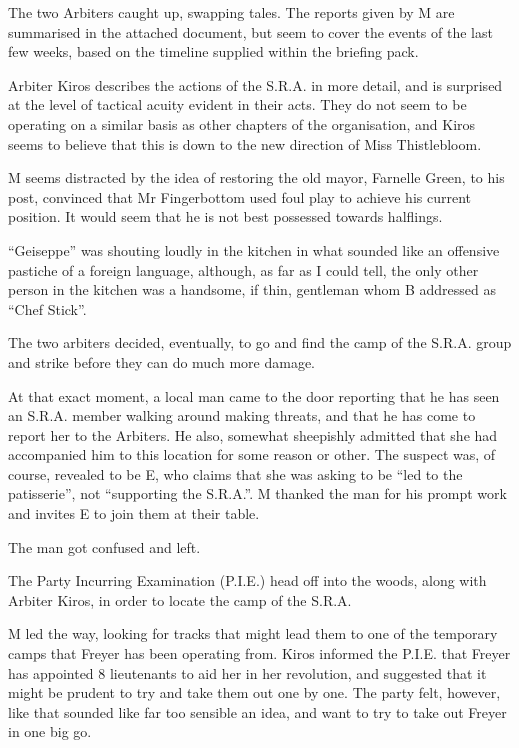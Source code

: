 The two Arbiters caught up, swapping tales. The reports given by M are summarised in the attached document, but seem to cover the events of the last few weeks, based on the timeline supplied within the briefing pack.\medskip

Arbiter Kiros describes the actions of the S.R.A. in more detail, and is surprised at the level of tactical acuity evident in their acts. They do not seem to be operating on a similar basis as other chapters of the organisation, and Kiros seems to believe that this is down to the new direction of Miss Thistlebloom.\medskip

M seems distracted by the idea of restoring the old mayor, Farnelle Green, to his post, convinced that Mr Fingerbottom used foul play to achieve his current position. It would seem that he is not best possessed towards halflings.\medskip

“Geiseppe” was shouting loudly in the kitchen in what sounded like an offensive pastiche of a foreign language, although, as far as I could tell, the only other person in the kitchen was a handsome, if thin, gentleman whom B addressed as “Chef Stick”.\medskip

The two arbiters decided, eventually, to go and find the camp of the S.R.A. group and strike before they can do much more damage.\medskip

At that exact moment, a local man came to the door reporting that he has seen an S.R.A. member walking around making threats, and that he has come to report her to the Arbiters. He also, somewhat sheepishly admitted that she had accompanied him to this location for some reason or other. The suspect was, of course, revealed to be E, who claims that she was asking to be “led to the patisserie”, not “supporting the S.R.A.”. M thanked the man for his prompt work and invites E to join them at their table.\medskip

The man got confused and left.\medskip

The Party Incurring Examination (P.I.E.) head off into the woods, along with Arbiter Kiros, in order to locate the camp of the S.R.A.\medskip

M led the way, looking for tracks that might lead them to one of the temporary camps that Freyer has been operating from. Kiros informed the P.I.E. that Freyer has appointed 8 lieutenants to aid her in her revolution, and suggested that it might be prudent to try and take them out one by one. The party felt, however, like that sounded like far too sensible an idea, and want to try to take out Freyer in one big go.\medskip

